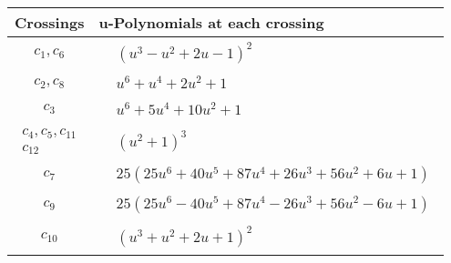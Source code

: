\documentclass[1p]{elsarticle_modified}
\theoremstyle{definition}
\begin{document}
\begin{tabular}{m{50pt}|m{274pt}}
Crossings & \hspace{64pt}u-Polynomials at each crossing \\
\hline $$\begin{aligned}c_{1},c_{6}\end{aligned}$$&$\begin{aligned}
&(u^3- u^2+2 u-1)^2
\end{aligned}$\\
\hline $$\begin{aligned}c_{2},c_{8}\end{aligned}$$&$\begin{aligned}
&u^6+u^4+2 u^2+1
\end{aligned}$\\
\hline $$\begin{aligned}c_{3}\end{aligned}$$&$\begin{aligned}
&u^6+5 u^4+10 u^2+1
\end{aligned}$\\
\hline $$\begin{aligned}c_{4},c_{5},c_{11}\\c_{12}\end{aligned}$$&$\begin{aligned}
&(u^2+1)^3
\end{aligned}$\\
\hline $$\begin{aligned}c_{7}\end{aligned}$$&$\begin{aligned}
&25(25 u^6+40 u^5+87 u^4+26 u^3+56 u^2+6 u+1)
\end{aligned}$\\
\hline $$\begin{aligned}c_{9}\end{aligned}$$&$\begin{aligned}
&25(25 u^6-40 u^5+87 u^4-26 u^3+56 u^2-6 u+1)
\end{aligned}$\\
\hline $$\begin{aligned}c_{10}\end{aligned}$$&$\begin{aligned}
&(u^3+u^2+2 u+1)^2
\end{aligned}$\\
\hline
\end{tabular}\\~\\
\newpage\renewcommand{\arraystretch}{1}
\end{document}
